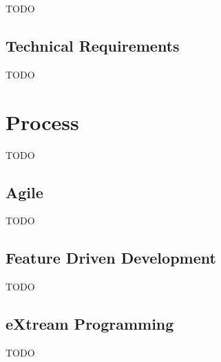 {TODO}

\subsection{Technical Requirements}

{TODO}


\section{Process}

{TODO}

\subsection{Agile}

{TODO}

\subsection{Feature Driven Development}

{TODO}

\subsection{eXtream Programming}

{TODO}